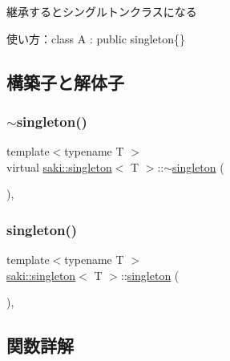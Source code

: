 継承するとシングルトンクラスになる 

使い方：class A \+: public singleton\{\} 

\subsection{構築子と解体子}
\mbox{\label{classsaki_1_1singleton_a7e18a317dec7a4658f6d3376f2dd3ebd}} 
\subsubsection{\texorpdfstring{$\sim$singleton()}{~singleton()}}
{\footnotesize\ttfamily template$<$typename T $>$ \\
virtual \mbox{\hyperlink{classsaki_1_1singleton}{saki\+::singleton}}$<$ T $>$\+::$\sim$\mbox{\hyperlink{classsaki_1_1singleton}{singleton}} (\begin{DoxyParamCaption}{ }\end{DoxyParamCaption})\hspace{0.3cm}{\ttfamily [inline]}, {\ttfamily [virtual]}}

\mbox{\label{classsaki_1_1singleton_a511f5d5e51fdac173fa0dbea858f5ee0}} 
\subsubsection{\texorpdfstring{singleton()}{singleton()}}
{\footnotesize\ttfamily template$<$typename T $>$ \\
\mbox{\hyperlink{classsaki_1_1singleton}{saki\+::singleton}}$<$ T $>$\+::\mbox{\hyperlink{classsaki_1_1singleton}{singleton}} (\begin{DoxyParamCaption}{ }\end{DoxyParamCaption})\hspace{0.3cm}{\ttfamily [inline]}, {\ttfamily [protected]}}



\subsection{関数詳解}
\mbox{\label{classsaki_1_1singleton_a507fa8bc891caf1ea18b6dd25475430e}} 
